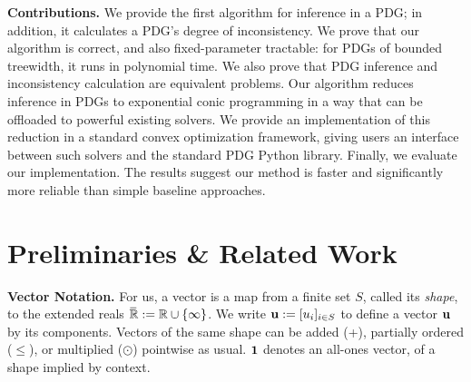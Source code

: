 \textbf{Contributions.}
We provide the first algorithm for inference in a PDG;
in addition, it calculates a PDG's degree of inconsistency. 
We prove that 
our algorithm
is correct, and also
fixed-parameter tractable: for PDGs of bounded treewidth,
it runs in polynomial time.
We also prove that PDG inference and inconsistency 
    calculation are equivalent problems.
Our algorithm reduces inference in PDGs to exponential conic programming
in a way that can be offloaded to powerful existing solvers.
We provide an implementation of this reduction in a
standard convex optimization framework, giving users an
interface between such solvers and the standard PDG Python library.
Finally, we evaluate our implementation. The
    results suggest our method is faster and 
    significantly more reliable than simple baseline approaches.

\section{Preliminaries \& Related Work}

\textbf{Vector Notation.}
For us, a vector is a map from a finite set $S$, called its 
\emph{shape},
to the extended reals $\mskip1mu\overline{\mskip-1mu\mathbb R\!}\, := \mathbb R \cup \{\infty\}$.
We write $\mathbf u := [u_i]_{i \in S}$ to define a vector $\mathbf u$ by its components.
Vectors of the same shape
can be added (+), partially ordered ($\le$), or multiplied ($\odot$) pointwise as usual.
$\mathbf 1$ denotes an all-ones vector, of a shape implied by context.


